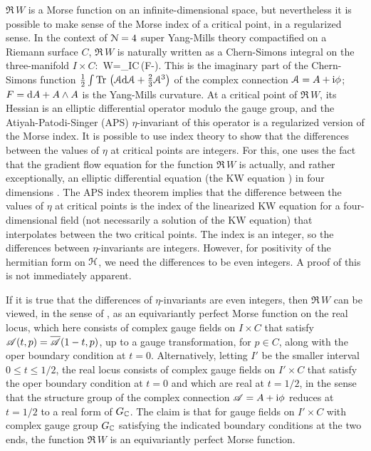 \documentclass[11pt,a4paper]{article}
\begin{document}
$\Re\,W$ is a Morse function on an infinite-dimensional space, but nevertheless it is possible to make sense of the Morse index of a critical point,
in a regularized sense.   In the context of ${\mathcal N}=4$ super Yang-Mills theory compactified on a Riemann surface $C$, $\Re\,W$ is naturally written
as a Chern-Simons integral on the three-manifold $I\times C$:
\be\label{jnu} \Re\,W=\int_{I\times C}\Tr\,\left(\phi\wedge F-\phi\wedge\phi\wedge\phi\right).\ee
This is the imaginary part of the Chern-Simons function  $\frac{1}{2}\int {\rm Tr}\,\left({\mathcal A}\mathrm d{\mathcal A} +\frac{2}{3}{\mathcal A}^3\right)$ 
of the complex connection ${\mathcal A}=A+{\mathrm i}\phi$; $F=\mathrm d A+A\wedge A$ is the Yang-Mills curvature.
At a critical point of $\Re\,W$, its Hessian  is an elliptic differential operator modulo the gauge
group, and the Atiyah-Patodi-Singer (APS)  $\eta$-invariant of this operator is a regularized version of the Morse index.    It is possible to use index theory
to show that the differences between the values of $\eta$ at critical points are integers.  For this, one uses the fact that the gradient flow equation
for the function $\Re\,W$ is actually, and rather exceptionally, an elliptic differential equation (the KW equation \cite{KW})  in four dimensions \cite{WittenAnalytic}.
The APS index theorem implies that the difference between the values of $\eta$ at critical points is the index of the linearized KW equation for
a four-dimensional field (not necessarily a solution of the KW equation) that interpolates between the two critical points.   The index is an integer,
so the differences between $\eta$-invariants  are integers.   However, for positivity of the hermitian form on ${\mathcal H}$, we need the differences to be
even integers.   A proof of this is not immediately apparent.   

If it is true that the differences of $\eta$-invariants are even integers, then $\Re\,W$ can be
viewed, in the sense of \cite{AB}, as an equivariantly perfect Morse function on the real locus, which here consists of complex gauge fields on $I\times C$ that satisfy ${\mathscr A}(t,p)=\overline{{\mathscr A}}(1-t,p)$, up to a gauge transformation, for $p\in C$, along with the oper boundary condition at $t=0$.   Alternatively, letting $I'$ be
the smaller interval $0\leq t\leq 1/2$, the real locus consists of complex gauge fields on $I'\times C$ that satisfy the oper boundary condition 
at $t=0$ and which are real at $t=1/2$, in the sense that the structure group of the complex connection ${\mathscr A}=A+{\mathrm i}\phi$ reduces at $t=1/2$ to a real
form of $G_{\mathbb C}$.    The claim is that for gauge fields on $I'\times C$ with complex gauge group $G_{\mathbb C}$ satisfying the indicated boundary conditions at the two ends,
the function $\Re\,W$ is an equivariantly perfect Morse function. 
\end{document}
